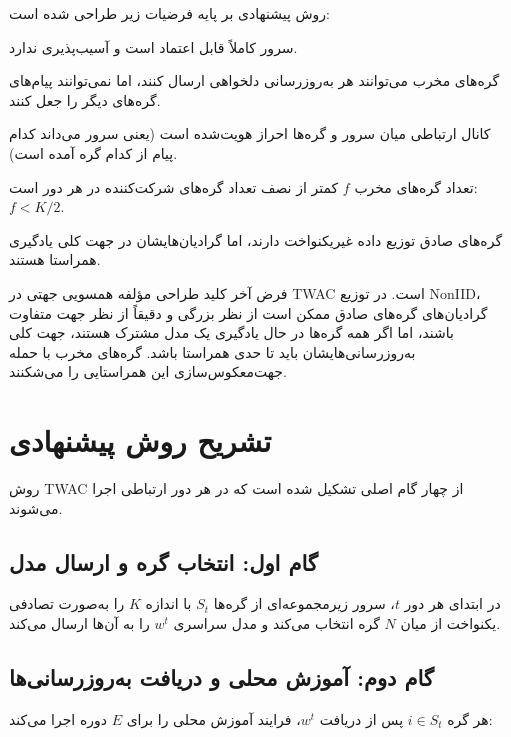 روش پیشنهادی بر پایه فرضیات زیر طراحی شده است:

\begin{itemize}
    \tick سرور کاملاً قابل اعتماد است و آسیب‌پذیری ندارد.
    
    \tick گره‌های مخرب می‌توانند هر به‌روزرسانی دلخواهی ارسال کنند، اما نمی‌توانند پیام‌های گره‌های دیگر را جعل کنند.
    
    \tick کانال ارتباطی میان سرور و گره‌ها احراز هویت‌شده است (یعنی سرور می‌داند کدام پیام از کدام گره آمده است).
    
    \tick تعداد گره‌های مخرب $f$ کمتر از نصف تعداد گره‌های شرکت‌کننده در هر دور است: $f < K/2$.
    
    \tick گره‌های صادق توزیع داده غیریکنواخت دارند، اما گرادیان‌هایشان در جهت کلی یادگیری همراستا هستند.
\end{itemize}

\begin{note}
    فرض آخر کلید طراحی مؤلفه همسویی جهتی در \gls{TWAC} است. در توزیع \gls{NonIID}، گرادیان‌های گره‌های صادق ممکن است از نظر بزرگی و دقیقاً از نظر جهت متفاوت باشند، اما اگر همه گره‌ها در حال یادگیری یک مدل مشترک هستند، جهت کلی به‌روزرسانی‌هایشان باید تا حدی همراستا باشد. گره‌های مخرب با حمله جهت‌معکوس‌سازی این همراستایی را می‌شکنند.
\end{note}


\section{تشریح روش پیشنهادی}
\label{sec:proposedapproach}

روش \gls{TWAC} از چهار گام اصلی تشکیل شده است که در هر دور ارتباطی اجرا می‌شوند.

\subsection{گام اول: انتخاب گره و ارسال مدل}

در ابتدای هر دور $t$، سرور زیرمجموعه‌ای از گره‌ها $S_t$ با اندازه $K$ را به‌صورت تصادفی یکنواخت از میان $N$ گره انتخاب می‌کند و مدل سراسری $w^t$ را به آن‌ها ارسال می‌کند.

\subsection{گام دوم: آموزش محلی و دریافت به‌روزرسانی‌ها}

هر گره $i \in S_t$ پس از دریافت $w^t$، فرایند آموزش محلی را برای $E$ دوره اجرا می‌کند:


